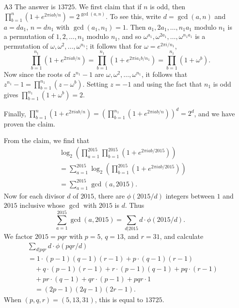 \documentclass[amssymb,twocolumn,pra,10pt,aps]{revtex4-1}
\newcommand{\FF}{\mathbb{F}}
\begin{document}
\begin{itemize}
\begin{proof}
By the previous paragraph, $\alpha$ and $\beta$ may be identified with elements of $\FF_p$, and we have $(\alpha/\beta)^n \equiv -1$, but the same does not hold with $n$ replaced by any smaller value. Since $\FF_p^\times$ is a cyclic group of order $p-1$, this forces $p \equiv 1 \pmod{n}$ as claimed.
\end{proof}


\item[A3]
The answer is $13725$.
We first claim that if $n$ is odd, then $\prod_{b=1}^{n} (1+e^{2\pi i ab/n}) = 2^{\gcd(a,n)}$. To see this, write $d = \gcd(a,n)$ and $a = da_1$, $n=dn_1$ with $\gcd(a_1,n_1) = 1$. Then
$a_1, 2a_1,\dots,n_1 a_1$ modulo $n_1$ is a permutation of $1,2,\dots,n_1$ modulo $n_1$, and so $\omega^{a_1},\omega^{2a_1},\dots,\omega^{n_1 a_1}$ is a permutation of $\omega,\omega^2,\ldots,\omega^{n_1}$;  it follows that for $\omega = e^{2\pi i/n_1}$,
\[
\prod_{b=1}^{n_1} (1+e^{2\pi i a b/n}) =
\prod_{b=1}^{n_1} (1+e^{2\pi i a_1 b/n_1}) = \prod_{b=1}^{n_1} (1+\omega^b).
\]
Now since the roots of $z^{n_1}-1$ are $\omega,\omega^2,\ldots,\omega^{n_1}$, it follows that
$z^{n_1}-1 = \prod_{b=1}^{n_1} (z-\omega^b)$. Setting $z=-1$ and using the fact that $n_1$ is odd gives $\prod_{b=1}^{n_1} (1+\omega^b) = 2$. 

Finally,
$\prod_{b=1}^{n} (1+e^{2\pi i ab/n}) = (\prod_{b=1}^{n_1} (1+e^{2\pi i ab/n}))^d = 2^d$, and we have proven the claim.

From the claim, we find that
\begin{align*}
&\log_2 \left( \prod_{a=1}^{2015} \prod_{b=1}^{2015} (1+e^{2\pi i a b/2015}) \right) \\
&= \sum_{a=1}^{2015} \log_2 \left(\prod_{b=1}^{2015} (1+e^{2\pi i a b/2015}) \right) \\
&= \sum_{a=1}^{2015} \gcd(a,2015).
\end{align*}
Now for each divisor $d$ of $2015$, there are $\phi(2015/d)$ integers between $1$ and $2015$ inclusive whose $\gcd$ with $2015$ is $d$. Thus
\[
\sum_{a=1}^{2015} \gcd(a,2015) = \sum_{d|2015} d\cdot \phi(2015/d).
\]
We factor $2015 = pqr$ with $p=5$, $q=13$, and $r=31$, and calculate
\begin{align*}
&\sum_{d|pqr} d\cdot \phi(pqr/d) \\
&= 1 \cdot (p-1)(q-1)(r-1) + p \cdot (q-1)(r-1) \\
&\quad + q\cdot (p-1)(r-1) + r\cdot (p-1)(q-1) + pq \cdot (r-1) \\
& \quad + pr\cdot (q-1) + qr\cdot (p-1) + pqr \cdot 1 \\
&\quad = (2p-1)(2q-1)(2r-1).
\end{align*}
When $(p,q,r) = (5,13,31)$, this is equal to $13725$.


\end{itemize}
\end{document}
